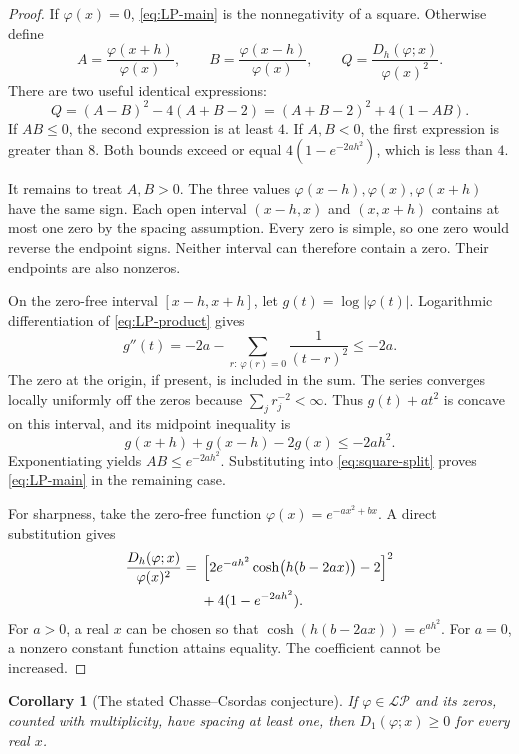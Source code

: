 \documentclass[11pt]{article}
\newtheorem{corollary}[theorem]{Corollary}
\theoremstyle{remark}\newtheorem{remark}[theorem]{Remark}
\newcommand{\LP}{\mathcal{LP}}
\begin{document}
\begin{proof}
If $\varphi(x)=0$, \eqref{eq:LP-main} is the nonnegativity of a square.
Otherwise define
\[
 A=\frac{\varphi(x+h)}{\varphi(x)},\qquad
 B=\frac{\varphi(x-h)}{\varphi(x)},\qquad
 Q=\frac{D_h(\varphi;x)}{\varphi(x)^2}.
\]
There are two useful identical expressions:
\begin{equation}\label{eq:square-split}
 Q=(A-B)^2-4(A+B-2)=(A+B-2)^2+4(1-AB).
\end{equation}
If $AB\le0$, the second expression is at least $4$.
If $A,B<0$, the first expression is greater than $8$.
Both bounds exceed or equal $4(1-e^{-2ah^2})$, which is less than $4$.

It remains to treat $A,B>0$. The three values
$\varphi(x-h),\varphi(x),\varphi(x+h)$ have the same sign.
Each open interval $(x-h,x)$ and $(x,x+h)$ contains at most one zero
by the spacing assumption. Every zero is simple, so one zero would
reverse the endpoint signs. Neither interval can therefore contain a
zero. Their endpoints are also nonzeros.

On the zero-free interval $[x-h,x+h]$, let $g(t)=\log|\varphi(t)|$.
Logarithmic differentiation of \eqref{eq:LP-product} gives
\begin{equation}\label{eq:log-curvature}
 g''(t)=-2a-\sum_{r:\,\varphi(r)=0}\frac1{(t-r)^2}\le-2a.
\end{equation}
The zero at the origin, if present, is included in the sum. The series
converges locally uniformly off the zeros because $\sum_jr_j^{-2}<\infty$.
Thus $g(t)+at^2$ is concave on this interval, and its midpoint inequality is
\[
 g(x+h)+g(x-h)-2g(x)\le-2ah^2.
\]
Exponentiating yields $AB\le e^{-2ah^2}$. Substituting into
\eqref{eq:square-split} proves \eqref{eq:LP-main} in the remaining case.

For sharpness, take the zero-free function $\varphi(x)=e^{-ax^2+bx}$.
A direct substitution gives
\begin{align}
 \frac{D_h(\varphi;x)}{\varphi(x)^2}
 ={}&\left[2e^{-ah^2}\cosh\bigl(h(b-2ax)\bigr)-2\right]^2\notag\\
 &+4(1-e^{-2ah^2}).\label{eq:Gaussian-sharp}
\end{align}
For $a>0$, a real $x$ can be chosen so that
$\cosh(h(b-2ax))=e^{ah^2}$. For $a=0$, a nonzero constant function
attains equality. The coefficient cannot be increased.
\end{proof}

\begin{corollary}[The stated Chasse--Csordas conjecture]
If $\varphi\in\LP$ and its zeros, counted with multiplicity, have spacing
at least one, then $D_1(\varphi;x)\ge0$ for every real $x$.
\end{corollary}
\end{document}
